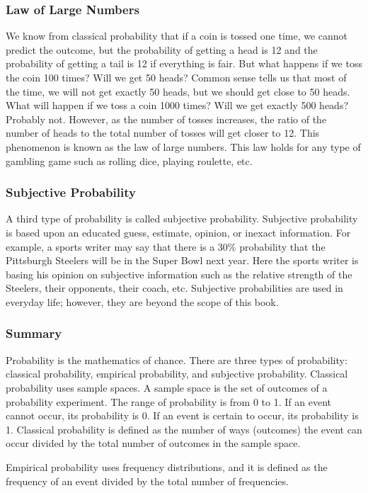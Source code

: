 \subsubsection{Law of Large Numbers}
We know from classical probability that if a coin is tossed one time, we cannot predict the outcome, but the probability of getting a head is 12 and the probability of getting a tail is 12 if everything is fair. But what happens if we toss the coin 100 times? Will we get 50 heads? Common sense tells us that most of the time, we will not get exactly 50 heads, but we should get close to 50 heads. What will happen if we toss a coin 1000 times? Will we get exactly 500 heads? Probably not. However, as the number of tosses increases, the ratio of the number of heads to the total number of tosses will get closer to 12. This phenomenon is known as the law of large numbers. This law holds for any type of gambling game such as rolling dice, playing roulette, etc.


\subsubsection{Subjective Probability}
A third type of probability is called subjective probability. Subjective probability is based upon an educated guess, estimate, opinion, or inexact information. For example, a sports writer may say that there is a 30\% probability that the Pittsburgh Steelers will be in the Super Bowl next year. Here the sports writer is basing his opinion on subjective information such as the relative strength of the Steelers, their opponents, their coach, etc. Subjective probabilities are used in everyday life; however, they are beyond the scope of this book.


\subsubsection{Summary}
Probability is the mathematics of chance. There are three types of probability: classical probability, empirical probability, and subjective probability. Classical probability uses sample spaces. A sample space is the set of outcomes of a probability experiment. The range of probability is from 0 to 1. If an event cannot occur, its probability is 0. If an event is certain to occur, its probability is 1. Classical probability is defined as the number of ways (outcomes) the event can occur divided by the total number of outcomes in the sample space.

Empirical probability uses frequency distributions, and it is defined as the frequency of an event divided by the total number of frequencies.

